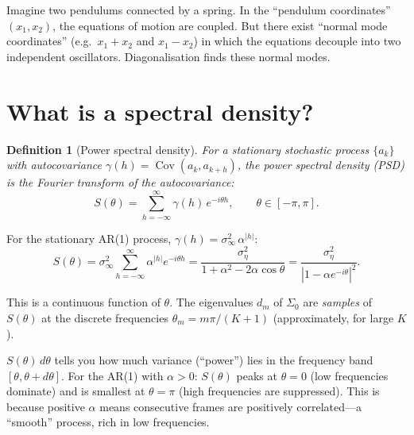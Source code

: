 \documentclass[11pt,a4paper]{article}
\newtheorem{definition}[theorem]{Definition}
\newcommand{\Cov}{\operatorname{Cov}}
\newcommand{\sigeta}{\sigma_\eta^2}
\newcommand{\siginf}{\sigma_\infty^2}
\begin{document}
\begin{intuitionbox}
Imagine two pendulums connected by a spring.  In the ``pendulum coordinates'' $(x_1, x_2)$, the equations of motion are coupled.  But there exist ``normal mode coordinates'' (e.g.\ $x_1 + x_2$ and $x_1 - x_2$) in which the equations decouple into two independent oscillators.  Diagonalisation finds these normal modes.
\end{intuitionbox}


\section{What is a spectral density?}
\label{sec:q19}

\begin{definition}[Power spectral density]
For a stationary stochastic process $\{a_k\}$ with autocovariance $\gamma(h) = \Cov(a_k, a_{k+h})$, the \emph{power spectral density} (PSD) is the Fourier transform of the autocovariance:
\begin{equation}
  S(\theta) = \sum_{h=-\infty}^{\infty} \gamma(h)\,e^{-i\theta h}, \qquad \theta \in [-\pi, \pi].
\end{equation}
\end{definition}

For the stationary AR(1) process, $\gamma(h) = \siginf\,\alpha^{|h|}$:
\begin{equation}
  S(\theta) = \siginf \sum_{h=-\infty}^{\infty}\alpha^{|h|}e^{-i\theta h} = \frac{\sigeta}{1 + \alpha^2 - 2\alpha\cos\theta} = \frac{\sigeta}{|1 - \alpha e^{-i\theta}|^2}.
\end{equation}

This is a continuous function of $\theta$.  The eigenvalues $d_m$ of $\Sigma_0$ are \emph{samples} of $S(\theta)$ at the discrete frequencies $\theta_m = m\pi/(K+1)$ (approximately, for large $K$).

\begin{intuitionbox}
$S(\theta)\,d\theta$ tells you how much variance (``power'') lies in the frequency band $[\theta, \theta + d\theta]$.  For the AR(1) with $\alpha > 0$: $S(\theta)$ peaks at $\theta = 0$ (low frequencies dominate) and is smallest at $\theta = \pi$ (high frequencies are suppressed).  This is because positive $\alpha$ means consecutive frames are positively correlated---a ``smooth'' process, rich in low frequencies.
\end{intuitionbox}
\end{document}
